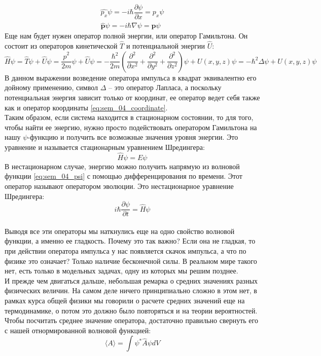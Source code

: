 \documentclass[12pt]{article}
\begin{document}
\begin{gather}
\label{eq:sem_04_momentum}
    \hat{p_x}\psi = -i\hbar\dfrac{\partial\psi}{\partial x} = p_x \psi\\
    \hat{\textbf{p}}\psi = -i\hbar\nabla\psi = \textbf{p} \psi
\end{gather}
Еще нам будет нужен оператор полной энергии, или оператор Гамильтона. Он состоит из операторов кинетической $\hat{T}$ и потенциальной энергии $\hat{U}$:
\begin{equation}
\label{eq:sem_04_hamilton}
    \hat{H}\psi = \hat{T}\psi + \hat{U}\psi = \dfrac{\hat{p}^2}{2m}\psi + \hat{U}\psi = -\dfrac{\hbar^2}{2m}\left(\dfrac{\partial^2}{\partial x^2} + \dfrac{\partial^2}{\partial y^2} + \dfrac{\partial^2}{\partial z^2}\right)\psi + U(x,y,z)\psi = -\hbar^2\Delta\psi + U(x,y,z)\psi
\end{equation}
В данном выражении возведение оператора импульса в квадрат эквивалентно его дойному применению, символ $\Delta$ -- это оператор Лапласа, а поскольку потенциальная энергия зависит только от координат, ее оператор ведет себя также как и оператор координаты \ref{eq:sem_04_coordinate}. 
\\
Таким образом, если система находится в стационарном состоянии, то для того, чтобы найти ее энергию, нужно просто подействовать оператором Гамильтона на нашу $\psi$-функцию и получить все возможные значения уровня энергии. Это уравнение и называется стационарным уравнением Шредингера:
\begin{equation}
\label{eq:sem_04_schrodinger}
    \hat{H}\psi = E\psi
\end{equation}
В нестационарном случае, энергию можно получить напрямую из волновой функции \ref{eq:sem_04_psi} с помощью дифференцирования по времени. Этот оператор называют оператором эволюции. Это нестационарное уравнение Шредингера:
\begin{equation*}
    i\hbar\dfrac{\partial\psi}{\partial t} = \hat{H}\psi
\end{equation*}
\\
Выводя все эти операторы мы наткнулись еще на одно свойство волновой функции, а именно ее гладкость. Почему это так важно? Если она не гладкая, то при действии оператора импульса у нас появляется скачок импульса, а что по физике это означает? Только наличие бесконечной силы. В реальном мире такого нет, есть только в модельных задачах, одну из которых мы решим позднее.
\\
И прежде чем двигаться дальше, небольшая ремарка о средних значениях разных физических величин. На самом деле ничего принципиально сложно в этом нет, в рамках курса общей физики мы говорили о расчете средних значений еще на термодинамике, о потом это должно было повторяться и на теории вероятностей. Чтобы посчитать среднее значение оператора, достаточно правильно свернуть его с нашей отнормированной волновой функцией:
\begin{equation*}
    \langle A\rangle = \int\psi^*\hat{A}\psi dV
\end{equation*}
\end{document}

